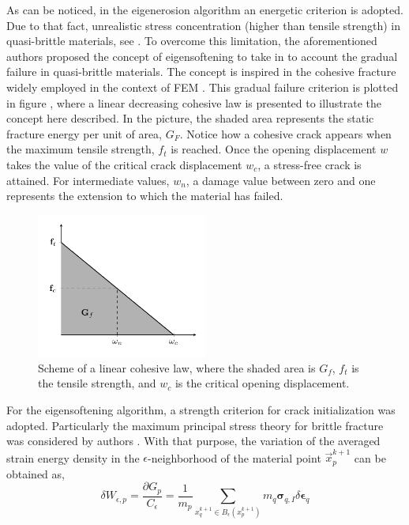 \message{ !name(2020_EFM_MPM_Eigensoftening.tex)}\documentclass[preprint,12pt,a4paper]{elsarticle}
\newcommand{\tens}[1]{
  \ensuremath{\mathbf{{#1}}}
}
\begin{document}
As can be noticed, in the eigenerosion algorithm an energetic
criterion is adopted. Due to that fact, unrealistic stress
concentration (higher than tensile strength) in quasi-brittle materials, see
\cite{Navas_2017_ES}. To overcome this limitation, the aforementioned
authors proposed the concept of eigensoftening to take in to account
the gradual failure in quasi-brittle materials. The concept is
inspired in the cohesive fracture widely employed in the context of
FEM \cite{Ortiz_1999}. This gradual failure criterion is plotted in
figure \label{fig:Damage-ft-wc}, where a linear decreasing cohesive
law is presented to illustrate the concept here described. In the
picture, the shaded area represents the static fracture energy per
unit of area, $G_F$. Notice how a cohesive crack appears when the
maximum tensile strength, $f_t$ is reached. Once the opening
displacement $w$ takes the value of the critical crack displacement
$w_c$, a stress-free crack is attained. For intermediate values,
$w_n$, a damage value between zero and one represents the extension to
which the material has failed.
\begin{figure}
  \centering
  \includegraphics[width=0.5\textwidth]{Figures/Damage}
  \caption{Scheme of a linear cohesive law, where the shaded area is
    $G_f$, $f_t$ is the tensile strength, and $w_c$ is the critical
    opening displacement.}
  \label{fig:Damage-ft-wc}
\end{figure}
For the eigensoftening algorithm, a strength criterion for crack
initialization was adopted. Particularly the maximum principal stress
theory for brittle fracture was considered by authors
\cite{Navas_2017_ES}. With that purpose, the variation of the averaged strain
energy density in the $\epsilon$-neighborhood of the material point
$\vec{x}_p^{k+1}$ can be obtained as,
\begin{equation}
  \label{eq:variation-averaged-strain-energy-density}
  \delta W_{\epsilon,p} = \frac{\partial G_p}{C_{\epsilon}} =
  \frac{1}{m_p} \sum_{x_q^{k+1} \in
  B_{\epsilon}(x_p^{k+1})} m_q \tens{\sigma}_{q,I} \delta \tens{\epsilon}_q
\end{equation}
\end{document}
